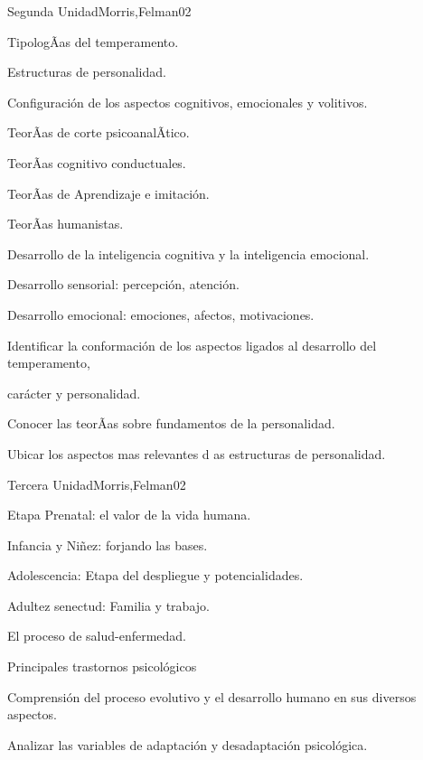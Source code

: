 \begin{syllabus}
\begin{unit}{Segunda Unidad}{Morris,Felman}{0}{2}
\begin{topics}
	\item TipologÃ­as del temperamento.
	\item Estructuras de personalidad.
	\item Configuración de los aspectos cognitivos, emocionales y volitivos.
	\item TeorÃ­as de corte psicoanalÃ­tico.
	\item TeorÃ­as cognitivo conductuales.
	\item TeorÃ­as de Aprendizaje e imitación.
	\item TeorÃ­as humanistas.
	\item Desarrollo de la inteligencia cognitiva y la inteligencia emocional.
	\item Desarrollo sensorial: percepción, atención.
	\item Desarrollo emocional: emociones, afectos, motivaciones.
\end{topics}
\begin{unitgoals}
	\item Identificar la conformación de los aspectos ligados al desarrollo del temperamento,  
	\item       carácter y personalidad.
	\item Conocer las teorÃ­as sobre fundamentos de la personalidad.
	\item Ubicar los aspectos mas relevantes d as estructuras de personalidad.
\end{unitgoals}
\end{unit}

\begin{unit}{Tercera Unidad}{Morris,Felman}{0}{2}
\begin{topics}
	\item  Etapa Prenatal: el valor de la vida humana.
	\item Infancia y Niñez: forjando las bases.
	\item Adolescencia: Etapa del despliegue y potencialidades.
	\item Adultez senectud: Familia y trabajo.
	\item El proceso de salud-enfermedad.
	\item Principales trastornos psicológicos
\end{topics}
\begin{unitgoals}
	\item Comprensión del proceso evolutivo y el desarrollo humano en sus diversos aspectos.
	\item Analizar las variables de adaptación y desadaptación psicológica.
\end{unitgoals}
\end{unit}


\end{syllabus}
